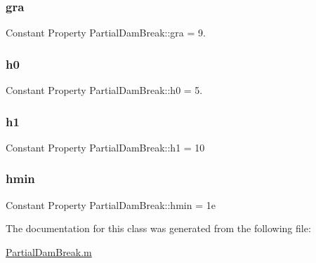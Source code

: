 \subsubsection{\texorpdfstring{gra}{gra}}
{\footnotesize\ttfamily Constant Property Partial\+Dam\+Break\+::gra = 9.}

\mbox{\label{class_partial_dam_break_a317b41054953987abce4544b0030106d}} 
\subsubsection{\texorpdfstring{h0}{h0}}
{\footnotesize\ttfamily Constant Property Partial\+Dam\+Break\+::h0 = 5.}

\mbox{\label{class_partial_dam_break_a717a29a3eefbf7b50f3b85f2f5dd4915}} 
\subsubsection{\texorpdfstring{h1}{h1}}
{\footnotesize\ttfamily Constant Property Partial\+Dam\+Break\+::h1 = 10}

\mbox{\label{class_partial_dam_break_a9c203f21ba2f5283672ba2e1e6101466}} 
\subsubsection{\texorpdfstring{hmin}{hmin}}
{\footnotesize\ttfamily Constant Property Partial\+Dam\+Break\+::hmin = 1e}



The documentation for this class was generated from the following file\+:\begin{DoxyCompactItemize}
\item 
\hyperlink{_partial_dam_break_8m}{Partial\+Dam\+Break.\+m}\end{DoxyCompactItemize}
